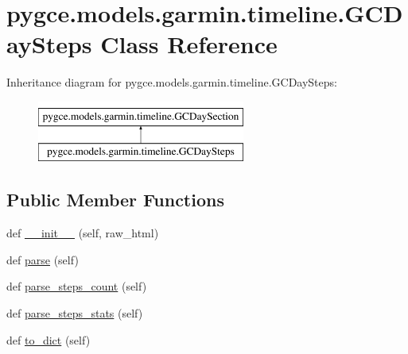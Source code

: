 \hypertarget{classpygce_1_1models_1_1garmin_1_1timeline_1_1_g_c_day_steps}{}\section{pygce.\+models.\+garmin.\+timeline.\+G\+C\+Day\+Steps Class Reference}
\label{classpygce_1_1models_1_1garmin_1_1timeline_1_1_g_c_day_steps}
Inheritance diagram for pygce.\+models.\+garmin.\+timeline.\+G\+C\+Day\+Steps\+:\begin{figure}[H]
\begin{center}
\leavevmode
\includegraphics[height=2.000000cm]{classpygce_1_1models_1_1garmin_1_1timeline_1_1_g_c_day_steps}
\end{center}
\end{figure}
\subsection*{Public Member Functions}
\begin{DoxyCompactItemize}
\item 
def \hyperlink{classpygce_1_1models_1_1garmin_1_1timeline_1_1_g_c_day_steps_a0b8cc0a273e2a35d5326b3e06c39e4a1}{\+\_\+\+\_\+init\+\_\+\+\_\+} (self, raw\+\_\+html)
\item 
def \hyperlink{classpygce_1_1models_1_1garmin_1_1timeline_1_1_g_c_day_steps_ae75ac9895d92ca73d95e451d92454f4e}{parse} (self)
\item 
def \hyperlink{classpygce_1_1models_1_1garmin_1_1timeline_1_1_g_c_day_steps_ab5fa162419e53f44464d5e0ce5d4a31f}{parse\+\_\+steps\+\_\+count} (self)
\item 
def \hyperlink{classpygce_1_1models_1_1garmin_1_1timeline_1_1_g_c_day_steps_a994d3d53c4f1eaa9729349d043e010f7}{parse\+\_\+steps\+\_\+stats} (self)
\item 
def \hyperlink{classpygce_1_1models_1_1garmin_1_1timeline_1_1_g_c_day_steps_ae464eda48e08d995c704199a73055e95}{to\+\_\+dict} (self)
\end{DoxyCompactItemize}
